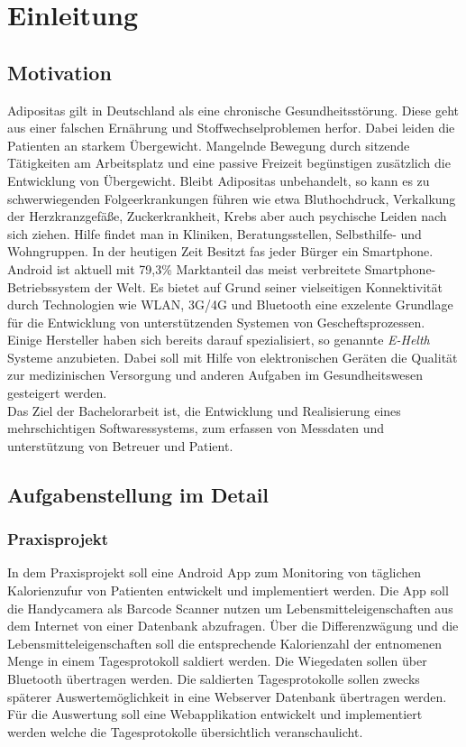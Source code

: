 
\chapter{Einleitung} 

\section{Motivation}

Adipositas gilt in Deutschland als eine chronische Gesundheitsst\"orung.
Diese geht aus einer falschen Ern\"ahrung und Stoffwechselproblemen herfor.
Dabei leiden die Patienten an starkem \"Ubergewicht.
Mangelnde Bewegung durch sitzende T\"atigkeiten am Arbeitsplatz und eine passive Freizeit beg\"unstigen zus\"atzlich die Entwicklung von \"Ubergewicht.
Bleibt Adipositas unbehandelt, so kann es  zu schwerwiegenden Folgeerkrankungen f\"uhren wie etwa Bluthochdruck,
Verkalkung der Herzkranzgef\"a\ss{}e, Zuckerkrankheit, Krebs aber auch psychische Leiden nach sich ziehen.
Hilfe findet man in Kliniken, Beratungsstellen, Selbsthilfe- und Wohngruppen.
In der heutigen Zeit Besitzt fas jeder B\"urger ein Smartphone.
Android ist aktuell mit 79,3\% Marktanteil das meist verbreitete Smartphone-Betriebssystem der Welt.
Es bietet auf Grund seiner vielseitigen Konnektivit\"at durch Technologien wie WLAN, 3G/4G und Bluetooth 
eine exzelente Grundlage f\"ur die Entwicklung von unterst\"utzenden Systemen von Gescheftsprozessen.
Einige Hersteller haben sich bereits darauf spezialisiert, so genannte \emph{E-Helth} Systeme anzubieten.
Dabei soll mit Hilfe von elektronischen Ger\"aten die Qualit\"at zur medizinischen Versorgung und anderen Aufgaben im Gesundheitswesen gesteigert werden. \\
Das Ziel der Bachelorarbeit ist, die Entwicklung und Realisierung eines mehrschichtigen Softwaressystems,
zum erfassen von Messdaten und unterst\"utzung von Betreuer und Patient.




\section{Aufgabenstellung im Detail}

\subsection*{Praxisprojekt}

In dem Praxisprojekt soll eine Android App zum Monitoring von t\"aglichen Kalorienzufur von Patienten entwickelt und implementiert werden.
Die App soll die Handycamera als Barcode Scanner nutzen um Lebensmitteleigenschaften aus dem Internet von einer Datenbank abzufragen.
\"Uber die Differenzw\"agung und die Lebensmitteleigenschaften soll die entsprechende Kalorienzahl der entnomenen Menge
in einem Tagesprotokoll saldiert werden.
Die Wiegedaten sollen \"uber Bluetooth \"ubertragen werden. Die saldierten Tagesprotokolle
sollen zwecks sp\"aterer Auswertem\"oglichkeit in eine Webserver Datenbank \"ubertragen werden.
F\"ur die Auswertung soll eine Webapplikation entwickelt und implementiert werden welche die Tagesprotokolle \"ubersichtlich veranschaulicht.


